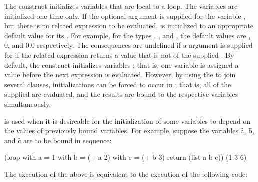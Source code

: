  

The  construct initializes variables that are local to 
a loop.  The variables are initialized one time only.
If the optional  argument is supplied for the variable 
, but there is no related expression to be evaluated, 
is initialized to an appropriate default value for its .
For example, for the types , , 
and ,
the default values are \nil, \f{0}, and \f{0.0} respectively.
The consequences are undefined if a 
 argument is supplied for  if
the related expression returns a value that is not of the supplied 
.
By default, the  construct initializes variables
; that is, one variable is assigned a value before the
next expression is evaluated.  However, by using the  
to join several  clauses, 
initializations can be forced to occur in ; that 
is, all of the supplied
 are evaluated, and the results are bound to the respective
variables simultaneously.


  is used when it is desireable for the initialization of
some variables to depend on the values of previously bound variables.
For example, suppose the variables \f{a}, \f{b}, and \f{c} are to be bound in sequence:
 
\code
 (loop with a = 1 
       with b = (+ a 2) 
       with c = (+ b 3)
       return (list a b c))
\EV (1 3 6)
\endcode
 
The execution of the above  is equivalent to the execution of
the following code:
 
